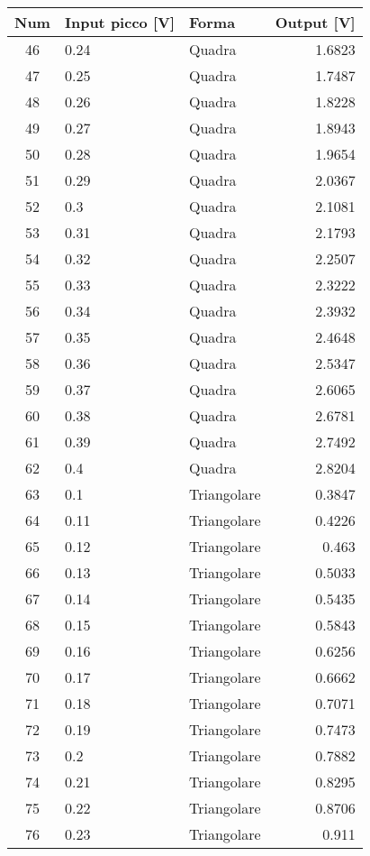 \documentclass[a4paper]{article}
\begin{document}
	\begin{center}
		
		\begin{tabular}{|c|llr|} 
			\toprule
			Num	&Input picco [V]&	Forma&	Output [V]\\
			\midrule
			46	&	0.24	&	Quadra	&	1.6823	\\
			47	&	0.25	&	Quadra	&	1.7487	\\
			48	&	0.26	&	Quadra	&	1.8228	\\
			49	&	0.27	&	Quadra	&	1.8943	\\
			50	&	0.28	&	Quadra	&	1.9654	\\
			51	&	0.29	&	Quadra	&	2.0367	\\
			52	&	0.3	&	Quadra	&	2.1081	\\
			53	&	0.31	&	Quadra	&	2.1793	\\
			54	&	0.32	&	Quadra	&	2.2507	\\
			55	&	0.33	&	Quadra	&	2.3222	\\
			56	&	0.34	&	Quadra	&	2.3932	\\
			57	&	0.35	&	Quadra	&	2.4648	\\
			58	&	0.36	&	Quadra	&	2.5347	\\
			59	&	0.37	&	Quadra	&	2.6065	\\
			60	&	0.38	&	Quadra	&	2.6781	\\
			61	&	0.39	&	Quadra	&	2.7492	\\
			62	&	0.4	&	Quadra	&	2.8204	\\
			\midrule
			63	&	0.1	&	Triangolare	&	0.3847	\\
			64	&	0.11	&	Triangolare	&	0.4226	\\
			65	&	0.12	&	Triangolare	&	0.463	\\
			66	&	0.13	&	Triangolare	&	0.5033	\\
			67	&	0.14	&	Triangolare	&	0.5435	\\
			68	&	0.15	&	Triangolare	&	0.5843	\\
			69	&	0.16	&	Triangolare	&	0.6256	\\
			70	&	0.17	&	Triangolare	&	0.6662	\\
			71	&	0.18	&	Triangolare	&	0.7071	\\
			72	&	0.19	&	Triangolare	&	0.7473	\\
			73	&	0.2	&	Triangolare	&	0.7882	\\
			74	&	0.21	&	Triangolare	&	0.8295	\\
			75	&	0.22	&	Triangolare	&	0.8706	\\
			76	&	0.23	&	Triangolare	&	0.911	\\

\end{tabular}
\end{center}
\end{document}
